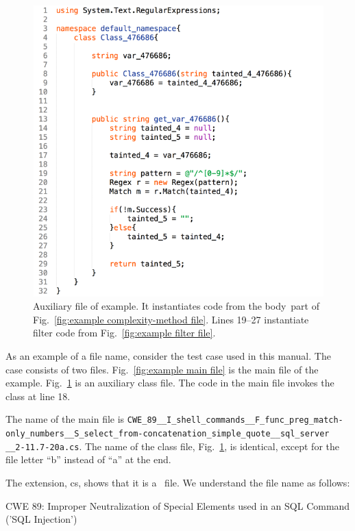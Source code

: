 \begin{figure}[tbp]
  \includegraphics[width=0.85\linewidth]{fig_example_code2.png}
  \caption{Auxiliary file of example.  It instantiates code from the
    \texlangle body\texrangle\ part of Fig.~\ref{fig:example complexity-method file}.
    Lines 19--27 instantiate filter code
    from Fig.~\ref{fig:example filter file}.}
  \label{fig:example aux file}
\end{figure}

As an example of a file name, consider the test case used in this manual.  The case
consists of
two files.
Fig.~\ref{fig:example main file} is the main file of the example.  
Fig.~\ref{fig:example aux file} is an auxiliary class file.  
The code in
the main file invokes the class at line 18.

The name of the main file is
\verb|CWE_89__I_shell_commands__F_func_preg_match-| \\
\verb|only_numbers__S_select_from-concatenation_simple_quote__sql_server| \\
\verb|__2-11.7-20a.cs|.
The name of the class file, Fig.~\ref{fig:example aux file}, is
identical, except for the
file letter ``b'' instead of ``a'' at the end.

The extension, cs, shows that it is a \CSharp\ file.
We understand the file name as follows:

\noindent CWE 89: Improper Neutralization of Special Elements used in an SQL Command
('SQL Injection') \cite{CWE89}

